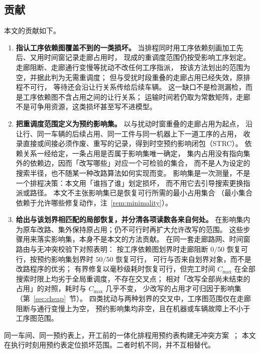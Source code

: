 \documentclass[manuscript,screen,review]{acmart}
\providecommand{\STRC}{\textsc{STRC}}
\begin{document}
\subsection{贡献}
\label{sec:contributions}

本文的贡献如下。

\begin{enumerate}[leftmargin=1.6em,itemsep=0.4em]
\item \textbf{指认工序依赖图覆盖不到的一类损坏。}
当排程同时用工序依赖刻画加工先后、又用时间窗记录走廊占用时，
现成的重调度范围仍按受影响工序划定。
走廊阻断、走廊通行变慢等扰动不改任何工序指派，
按该方法划出的范围为空，并据此判为无需重调度；
但与受扰时段重叠的走廊占用已经失效，原排程不可行，
等待还会沿让行关系传给后续车辆。
这一缺口不是检测漏检，而是工序依赖图不含占用之间的让行关系；
运输时间若仍取为常数矩阵，走廊不是可争用资源，这类损坏甚至写不进模型。

\item \textbf{把重调度范围定义为预约影响集。}
以与扰动时窗重叠的走廊占用为起点，
沿让行、同一车辆的后续占用、同一工件与同一机器上下一道工序的占用，
收录直接或间接必须作废、重写的记录，得到时空预约影响闭包（\STRC）。
依赖关系一经给定，一条占用是否属于影响集唯一确定，
集内占用没有指向集外的依赖边，因而「改写哪些」对应一个可检验的集合，
而不是人为设定的搜索半径，也不随某一种改路算法如何实现而变。
影响集是一次测量，不是一个排程决策：本文用「谁挡了谁」划定损坏，
而不用它去引导搜索更换指派或路径。
本文不主张影响集已是恢复可行所需的最小占用集合
（最小集合依赖于允许哪些修复动作，注~\ref{rem:minimality}）。

\item \textbf{给出与该划界相匹配的局部恢复，并分清各项读数各来自何处。}
在影响集内为原车改路、集外保持原占用；仍不可行时再扩大允许改写的范围。
这些步骤用来落实影响集，本身不是本文的方法贡献。
在同一套走廊路网、时间窗路由与无冲突校验下对照表明：
按工序依赖图划界时走廊阻断 $0/50$ 恢复可行，按预约影响集划界时 $50/50$ 恢复可行，
可行与否来自划界对象，而不是改路程序的优劣；
有界修复以毫秒级耗时恢复可行，但完工时间 \(C_{\max}\) 在全部搜索时限上均劣于全局重调度，不存在交叉点；
相对「改写全部尚未结束的占用」的对照，耗时与 \(C_{\max}\) 几乎不变，
少改写的占用才可归因于影响集（第~\ref{sec:cheap}~节）。
四类扰动与两种划界的交叉中，工序图范围仅在走廊阻断与通行变慢上为空，
预约影响集均非空，且在机器或车辆故障上不小于工序图范围。
\end{enumerate}

同一车间、同一预约表上，开工前的一体化排程用预约表构建无冲突方案~\cite{vanos2026exact,li2026framework,sun2023integrated}；
本文在执行时刻用预约表定位损坏范围。二者时机不同，并不互相替代。
\end{document}
